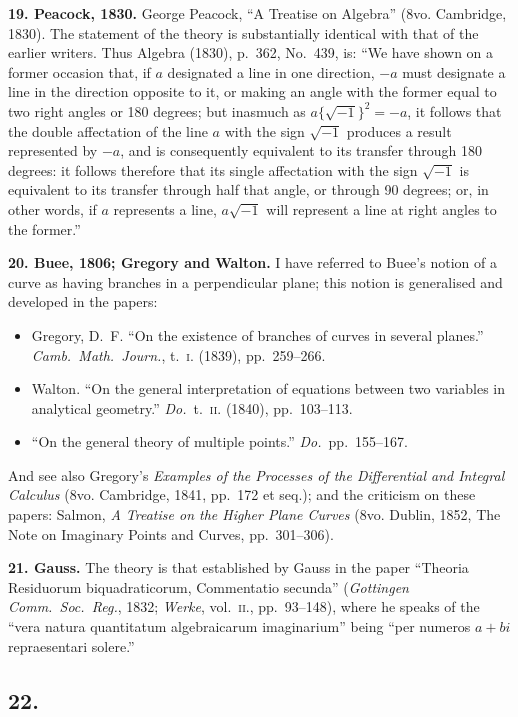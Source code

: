 \documentclass[11pt,a4paper]{article}
\theoremstyle{definition}
\begin{document}
\textbf{19. Peacock, 1830.} George Peacock, ``A Treatise on Algebra'' (8vo. Cambridge, 1830). The statement of the theory is substantially identical with that of the earlier writers. Thus Algebra (1830), p.~362, No.~439, is: ``We have shown on a former occasion that, if $a$ designated a line in one direction, $-a$ must designate a line in the direction opposite to it, or making an angle with the former equal to two right angles or 180 degrees; but inasmuch as $a\{\sqrt{-1}\}^2 = -a$, it follows that the double affectation of the line $a$ with the sign $\sqrt{-1}$ produces a result represented by $-a$, and is consequently equivalent to its transfer through 180 degrees: it follows therefore that its single affectation with the sign $\sqrt{-1}$ is equivalent to its transfer through half that angle, or through 90 degrees; or, in other words, if $a$ represents a line, $a\sqrt{-1}$ will represent a line at right angles to the former.''

\textbf{20. Buee, 1806; Gregory and Walton.} I have referred to Buee's notion of a curve as having branches in a perpendicular plane; this notion is generalised and developed in the papers:
\begin{itemize}
\item Gregory, D.~F. ``On the existence of branches of curves in several planes.'' \textit{Camb.\ Math.\ Journ.}, t.~\textsc{i}. (1839), pp.~259--266.
\item Walton. ``On the general interpretation of equations between two variables in analytical geometry.'' \textit{Do.}\ t.~\textsc{ii}. (1840), pp.~103--113.
\item ``On the general theory of multiple points.'' \textit{Do.}\ pp.~155--167.
\end{itemize}
And see also Gregory's \textit{Examples of the Processes of the Differential and Integral Calculus} (8vo. Cambridge, 1841, pp.~172 et seq.); and the criticism on these papers: Salmon, \textit{A Treatise on the Higher Plane Curves} (8vo. Dublin, 1852, The Note on Imaginary Points and Curves, pp.~301--306).

\textbf{21. Gauss.} The theory is that established by Gauss in the paper ``Theoria Residuorum biquadraticorum, Commentatio secunda'' (\textit{Gottingen Comm.\ Soc.\ Reg.}, 1832; \textit{Werke}, vol.~\textsc{ii}., pp.~93--148), where he speaks of the ``vera natura quantitatum algebraicarum imaginarium'' being ``per numeros $a + bi$ repraesentari solere.''

\subsection*{22.}
\end{document}
